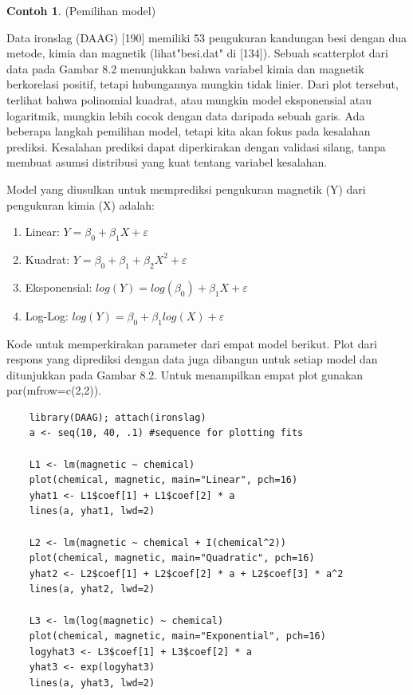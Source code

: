 \documentclass[a4paper,12pt]{article}
\theoremstyle{definition}
\newtheorem{example}{Contoh}[section]
\begin{document}
\begin{example}(Pemilihan model)
    
Data ironslag (DAAG) [190] memiliki 53 pengukuran kandungan besi dengan dua metode, kimia dan magnetik (lihat"besi.dat" di [134]). Sebuah scatterplot dari data pada Gambar 8.2 menunjukkan bahwa variabel kimia dan magnetik berkorelasi positif, tetapi hubungannya mungkin tidak linier. Dari plot tersebut, terlihat bahwa polinomial kuadrat, atau mungkin model eksponensial atau logaritmik, mungkin lebih cocok dengan data daripada
sebuah garis. Ada beberapa langkah pemilihan model, tetapi kita akan fokus pada kesalahan prediksi. Kesalahan prediksi dapat diperkirakan dengan validasi silang, tanpa membuat asumsi distribusi yang kuat tentang variabel kesalahan.

Model yang diusulkan untuk memprediksi pengukuran magnetik (Y) dari pengukuran kimia (X) adalah:

\begin{enumerate}
    \item Linear: $ Y = \beta _{0} + \beta _{1} X + \varepsilon $
    \item Kuadrat: $Y = \beta _{0} + \beta _{1} + \beta _{2}X^{2} + \varepsilon $
    \item Eksponensial: $log(Y) = log(\beta _{0}) + \beta _{1}X + \varepsilon $
    \item Log-Log: $log(Y) = \beta _{0} + \beta _{1} log(X) + \varepsilon $
\end{enumerate}
Kode untuk memperkirakan parameter dari empat model berikut. Plot dari respons yang diprediksi dengan data juga dibangun untuk setiap model dan ditunjukkan pada Gambar 8.2. Untuk menampilkan empat plot gunakan par(mfrow=c(2,2)).
\begin{lstlisting}
    library(DAAG); attach(ironslag)
    a <- seq(10, 40, .1) #sequence for plotting fits
    
    L1 <- lm(magnetic ~ chemical)
    plot(chemical, magnetic, main="Linear", pch=16)
    yhat1 <- L1$coef[1] + L1$coef[2] * a
    lines(a, yhat1, lwd=2)
    
    L2 <- lm(magnetic ~ chemical + I(chemical^2))
    plot(chemical, magnetic, main="Quadratic", pch=16)
    yhat2 <- L2$coef[1] + L2$coef[2] * a + L2$coef[3] * a^2
    lines(a, yhat2, lwd=2)

    L3 <- lm(log(magnetic) ~ chemical)
    plot(chemical, magnetic, main="Exponential", pch=16)
    logyhat3 <- L3$coef[1] + L3$coef[2] * a
    yhat3 <- exp(logyhat3)
    lines(a, yhat3, lwd=2)


\end{lstlisting}
\end{example}
\end{document}
